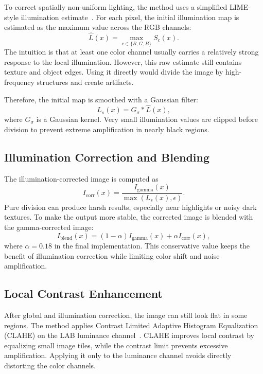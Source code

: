 \documentclass[11pt,a4paper]{article}
\begin{document}
To correct spatially non-uniform lighting, the method uses a simplified LIME-style illumination estimate~\cite{guo2016lime}. For each pixel, the initial illumination map is estimated as the maximum value across the RGB channels:
\begin{equation}
  \hat{L}(x)=\max_{c\in\{R,G,B\}} S_c(x).
\end{equation}
The intuition is that at least one color channel usually carries a relatively strong response to the local illumination. However, this raw estimate still contains texture and object edges. Using it directly would divide the image by high-frequency structures and create artifacts.

Therefore, the initial map is smoothed with a Gaussian filter:
\begin{equation}
  L_s(x)=G_\sigma * \hat{L}(x),
\end{equation}
where $G_\sigma$ is a Gaussian kernel. Very small illumination values are clipped before division to prevent extreme amplification in nearly black regions.

\subsection{Illumination Correction and Blending}

The illumination-corrected image is computed as
\begin{equation}
  I_{\mathrm{corr}}(x)=\frac{I_{\mathrm{gamma}}(x)}{\max(L_s(x),\epsilon)}.
\end{equation}
Pure division can produce harsh results, especially near highlights or noisy dark textures. To make the output more stable, the corrected image is blended with the gamma-corrected image:
\begin{equation}
  I_{\mathrm{blend}}(x)=(1-\alpha)I_{\mathrm{gamma}}(x)+\alpha I_{\mathrm{corr}}(x),
\end{equation}
where $\alpha=0.18$ in the final implementation. This conservative value keeps the benefit of illumination correction while limiting color shift and noise amplification.

\subsection{Local Contrast Enhancement}

After global and illumination correction, the image can still look flat in some regions. The method applies Contrast Limited Adaptive Histogram Equalization (CLAHE) on the LAB luminance channel~\cite{zuiderveld1994clahe,opencvclahe}. CLAHE improves local contrast by equalizing small image tiles, while the contrast limit prevents excessive amplification. Applying it only to the luminance channel avoids directly distorting the color channels.
\end{document}
